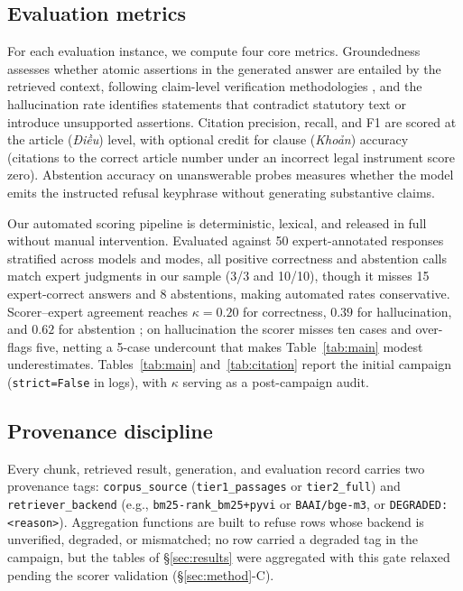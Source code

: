 \documentclass[conference,a4paper]{IEEEtran}
\begin{document}
\subsection{Evaluation metrics}
For each evaluation instance, we compute four core metrics. Groundedness assesses whether atomic assertions in the generated answer are entailed by the retrieved context, following claim-level verification methodologies \cite{min2023factscore,rashkin2023attribution}, and the hallucination rate identifies statements that contradict statutory text or introduce unsupported assertions. Citation precision, recall, and F1 are scored at the article (\emph{Điều}) level, with optional credit for clause (\emph{Khoản}) accuracy (citations to the correct article number under an incorrect legal instrument score zero). Abstention accuracy on unanswerable probes measures whether the model emits the instructed refusal keyphrase without generating substantive claims. 

Our automated scoring pipeline is deterministic, lexical, and released in full without manual intervention. Evaluated against 50 expert-annotated responses stratified across models and modes, all positive correctness and abstention calls match expert judgments in our sample (3/3 and 10/10), though it misses 15 expert-correct answers and 8 abstentions, making automated rates conservative. Scorer--expert agreement reaches $\kappa = 0.20$ for correctness, $0.39$ for hallucination, and $0.62$ for abstention \cite{cohen1960kappa}; on hallucination the scorer misses ten cases and over-flags five, netting a 5-case undercount that makes Table~\ref{tab:main} modest underestimates. Tables~\ref{tab:main} and~\ref{tab:citation} report the initial campaign (\texttt{strict=False} in logs), with $\kappa$ serving as a post-campaign audit.

\subsection{Provenance discipline}
\label{sec:provenance}
Every chunk, retrieved result, generation, and evaluation record carries two provenance tags: \texttt{corpus\_source} (\texttt{tier1\_passages} or \texttt{tier2\_full}) and \texttt{retriever\_backend} (e.g., \texttt{bm25-rank\_bm25+pyvi} or \texttt{BAAI/bge-m3}, or \texttt{DEGRADED:<reason>}). Aggregation functions are built to refuse rows whose backend is unverified, degraded, or mismatched; no row carried a degraded tag in the campaign, but the tables of \S\ref{sec:results} were aggregated with this gate relaxed pending the scorer validation (\S\ref{sec:method}-C).
\end{document}
